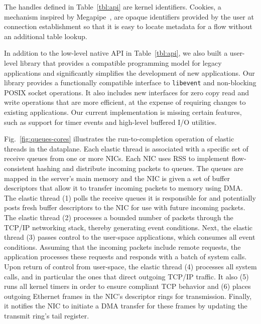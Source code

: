 The handles defined in Table~\ref{tbl:api} are kernel
identifiers. Cookies, a mechanism inspired by Megapipe~\cite{han2012megapipe},
are opaque identifiers provided by the user at connection establishment
so that it is easy to locate metadata for a flow without an additional table lookup.


In addition to the low-level native \ix API in Table~\ref{tbl:api}, we
also built a user-level library that provides a compatible programming
model for legacy applications and significantly simplifies the
development of new applications. Our library provides a functionally
compatible interface to \texttt{libevent} and non-blocking POSIX
socket operations. It also includes new interfaces for zero copy read
and write operations that are more efficient, at the expense of
requiring changes to existing applications. Our current implementation
is missing certain features, such as support for timer events and
high-level buffered I/O utilities.

 

Fig.~\ref{fig:queues-cores} illustrates the run-to-completion
operation of elastic threads in the \ix dataplane. Each elastic thread
is associated with a specific set of receive queues from one or more
NICs. Each NIC uses RSS to implement flow-consistent hashing and
distribute incoming packets to queues. The queues are mapped in the
server's main memory and the NIC is given a set of buffer descriptors
that allow it to transfer incoming packets to memory using DMA\@.  The
elastic thread (1) polls the receive queues it is responsible for and
potentially posts fresh buffer descriptors to the NIC for use with
future incoming packets. The elastic thread (2) processes a bounded
number of packets through the TCP/IP networking stack, thereby
generating event conditions. Next, the elastic thread (3) passes
control to the user-space applications, which consumes all event
conditions. Assuming that the incoming packets include remote
requests, the application processes these requests and responds with a
batch of system calls. Upon return of control from user-space, the
elastic thread (4) processes all system calls, and in particular the
ones that direct outgoing TCP/IP traffic. It also (5) runs all kernel
timers in order to ensure compliant TCP behavior and (6) places
outgoing Ethernet frames in the NIC's descriptor rings for
transmission. Finally, it notifies the NIC to initiate a DMA transfer
for these frames by updating the transmit ring's tail register.

